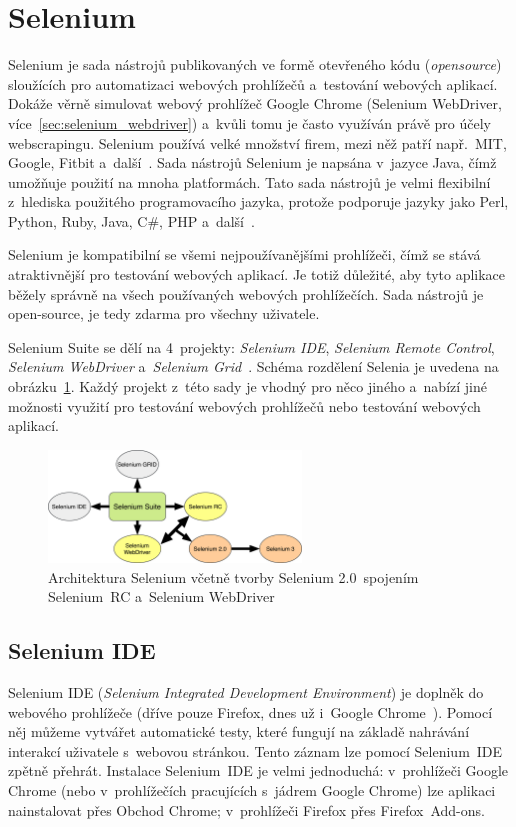 \section{Selenium}
\label{sec:selenium}
Selenium je sada nástrojů publikovaných ve formě otevřeného kódu (\textit{opensource}) sloužících pro automatizaci webových prohlížečů a~testování webových aplikací. Dokáže věrně simulovat webový prohlížeč Google Chrome (Selenium WebDriver, více~\ref{sec:selenium_webdriver}) a~kvůli tomu je často využíván právě pro účely webscrapingu. Selenium používá velké množství firem, mezi něž patří např.~MIT, Google, Fitbit a~další~\cite{bib:selenium_automatizace}. Sada nástrojů Selenium je napsána v~jazyce Java, čímž umožňuje použití na mnoha platformách. Tato sada nástrojů je velmi flexibilní z~hlediska použitého programovacího jazyka, protože podporuje jazyky jako Perl, Python, Ruby, Java, C\#, PHP a~další~\cite{bib:selenium_automatizace}.

Selenium je kompatibilní se všemi nejpoužívanějšími prohlížeči, čímž se stává atraktivnější pro testování webových aplikací. Je totiž důležité, aby tyto aplikace běžely správně na všech používaných webových prohlížečích. Sada nástrojů je open-source, je tedy zdarma pro všechny uživatele.

Selenium Suite se dělí na 4~projekty: \textit{Selenium IDE}, \textit{Selenium Remote Control}, \textit{Selenium WebDriver} a~\textit{Selenium Grid}~\cite{bib:selenium_projekty}. Schéma rozdělení Selenia je uvedena na obrázku~\ref{img:selenium}. Každý projekt z~této sady je vhodný pro něco jiného a~nabízí jiné možnosti využití pro testování webových prohlížečů nebo testování webových aplikací. 

\begin{figure}[hbt]
	\centering
	\includegraphics[width=0.6\textwidth]{images/selenium.png}
	\caption{Architektura Selenium včetně tvorby Selenium 2.0~spojením Selenium~RC a~Selenium WebDriver}
	\label{img:selenium}
\end{figure}

\subsection*{Selenium IDE}
Selenium IDE (\textit{Selenium Integrated Development Environment}) je doplněk do webového prohlížeče (dříve pouze Firefox, dnes už i~Google Chrome~\cite{bib:selenium_chrome}). Pomocí něj můžeme vytvářet automatické testy, které fungují na základě nahrávání interakcí uživatele s~webovou stránkou. Tento záznam lze pomocí Selenium~IDE zpětně přehrát. Instalace Selenium~IDE je velmi jednoduchá: v~prohlížeči Google Chrome (nebo v~prohlížečích pracujících s~jádrem Google Chrome) lze aplikaci nainstalovat přes Obchod Chrome; v~prohlížeči Firefox přes Firefox~Add-ons. 

